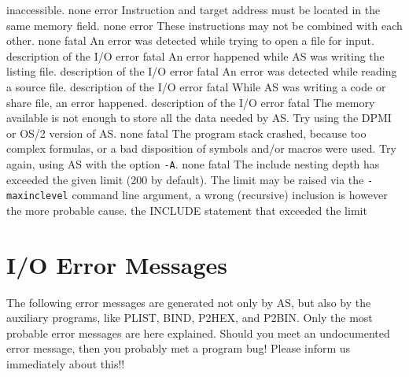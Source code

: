 \documentclass[12pt,twoside]{report}
\newcommand{\tty}[1]{{\tt #1}}
\begin{document}
\begin{description}
{                inaccessible.}
               {none}
               {error}
               {Instruction and target address must be located in the
                same memory field.}
               {none}
               {error}
               {These instructions may not be combined with each other.}
               {none}
               {fatal}
               {An error was detected while trying to open a file for input.}
               {description of the I/O error}
               {fatal}
               {An error happened while AS was writing the listing file.}
               {description of the I/O error}
               {fatal}
               {An error was detected while reading a source file.}
               {description of the I/O error}
               {fatal}
               {While AS was writing a code or share file, an error happened.}
               {description of the I/O error}
               {fatal}
               {The memory available is not enough to store all the data
                needed by AS. Try using the DPMI or OS/2 version of AS.}
               {none}
               {fatal}
               {The program stack crashed, because too complex formulas, or
                a bad disposition of symbols and/or macros were used. Try
                again, using AS with the option \tty{-A}.}
               {none}
               {fatal}
               {The include nesting depth has exceeded the given limit (200
                by default). The limit may be raised via the {\tt -maxinclevel}
                command line argument, a wrong (recursive) inclusion is however
                the more probable cause.}
               {the INCLUDE statement that exceeded the limit}
\end{description}


\cleardoublepage
\chapter{I/O Error Messages}

The following error messages are generated not only by AS, but also by
the auxiliary programs, like PLIST, BIND, P2HEX, and P2BIN. Only the most
probable error messages are here explained. Should you meet an undocumented
error message, then you probably met a program bug! Please inform us
immediately about this!!
\end{document}
